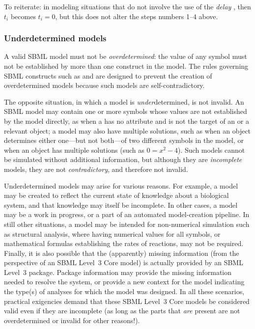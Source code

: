 To reiterate: in modeling situations that do not involve the use
of the \emph{delay} , then $t_i$ becomes $t_i = 0$,
but this does not alter the steps numbers 1--4 above.

\begin{blockRelChange}
\subsubsection{Underdetermined models}
\label{sec:underdetermined}

A valid SBML model must not be \emph{overdetermined}: the value of any symbol must not be established by more than one construct in the model.  The rules governing SBML constructs such as \InitialAssignment and \Rule are designed to prevent the creation of overdetermined models because such models are self-contradictory.

The opposite situation, in which a model is \emph{under}determined, is not invalid.  An SBML model may contain one or more symbols whose values are not established by the model directly, as when a \Parameter has no  attribute and is not the target of an \InitialAssignment or a relevant \Rule object; a model may also have multiple solutions, such as when an \AlgebraicRule object determines either one---but not both---of two different symbols in the model, or when an \AlgebraicRule object has multiple solutions (such as $0=x^2-4$).  Such models cannot be simulated without additional information, but although they are \emph{incomplete} models, they are not \emph{contradictory}, and therefore not invalid.

Underdetermined models may arise for various reasons.  For example, a model may be created to reflect the current state of knowledge about a biological system, and that knowledge may itself be incomplete.  In other cases, a model may be a work in progress, or a part of an automated model-creation pipeline.  In still other situations, a model may be intended for non-numerical simulation such as structural analysis, where having numerical values for all symbols, or mathematical formulas establishing the rates of reactions, may not be required.  Finally, it is also possible that the (apparently) missing information (from the perspective of an SBML Level~3 Core model) is actually provided by an SBML Level~3 package.  Package information may provide the missing information needed to resolve the system, or provide a new context for the model indicating the type(s) of analyses for which the model was designed.  In all these scenarios, practical exigencies demand that these SBML Level~3 Core models be considered valid even if they are incomplete (as long as the parts that \emph{are} present are not overdetermined or invalid for other reasons!).


\end{blockRelChange}
